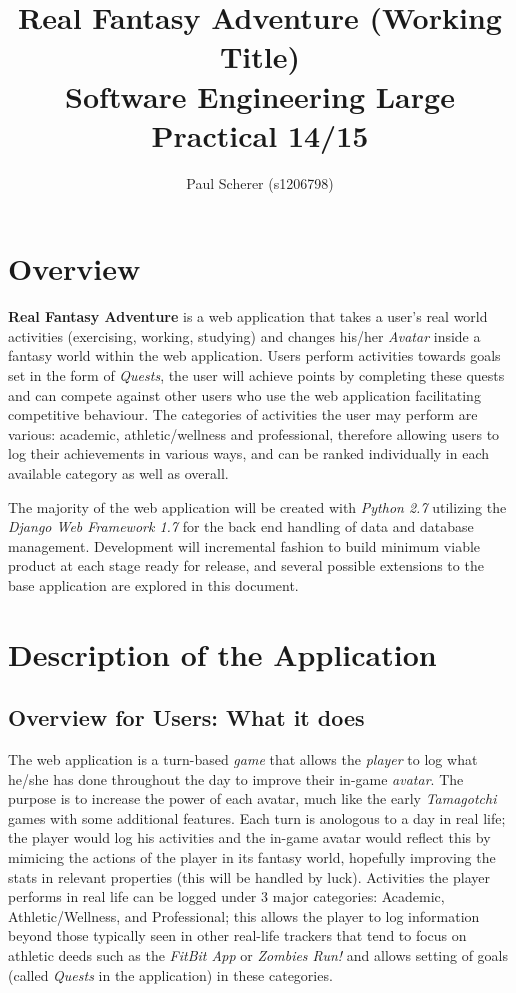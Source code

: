 \documentclass[11pt, a4paper]{article}
\begin{document}
\title{Real Fantasy Adventure (Working Title) \\
Software Engineering Large Practical 14/15}
\author{Paul Scherer (s1206798)}
\maketitle
\newpage

\tableofcontents
\newpage

\section{Overview}
\textbf{Real Fantasy Adventure} is a web application that takes a user's real world activities (exercising, working, studying) and changes his/her \textit{Avatar} inside a fantasy world within the web application. Users perform activities towards goals set in the form of \textit{Quests}, the user will achieve points by completing these quests and can compete against other users who use the web application facilitating competitive behaviour. The categories of activities the user may perform are various: academic, athletic/wellness and professional, therefore allowing users to log their achievements in various ways, and can be ranked individually in each available category as well as overall. 

The majority of the web application will be created with \textit{Python 2.7} utilizing the \textit{Django Web Framework 1.7} for the back end handling of data and database management. Development will incremental fashion to build minimum viable product at each stage ready for release, and several possible extensions to the base application are explored in this document.

\section{Description of the Application}
\subsection{Overview for Users: What it does}

The web application is a turn-based \textit{game} that allows the \textit{player} to log what he/she has done throughout the day to improve their in-game \textit{avatar}. The purpose is to increase the power of each avatar, much like the early \textit{Tamagotchi} games with some additional features. Each turn is anologous to a day in real life; the player would log his activities and the in-game avatar would reflect this by mimicing the actions of the player in its fantasy world, hopefully improving the stats in relevant properties (this will be handled by luck). Activities the player performs in real life can be logged under 3 major categories: Academic, Athletic/Wellness, and Professional; this allows the player to log information beyond those typically seen in other real-life trackers that tend to focus on athletic deeds such as the \textit{FitBit App} or \textit{Zombies Run!} and allows setting of goals (called \textit{Quests} in the application) in these categories. 
\end{document}
